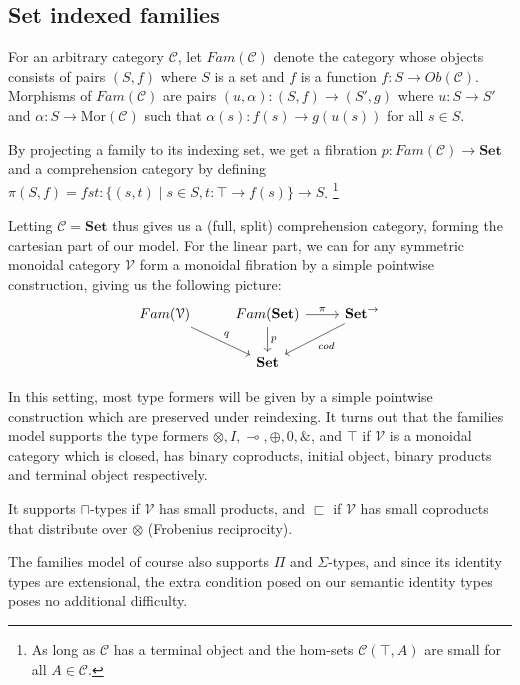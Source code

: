 \documentclass[a4paper,english]{lipics-v2018}
\begin{document}
\subsection{Set indexed families}
\begin{definition}
For an arbitrary category $\mathcal{C}$, let $Fam(\mathcal{C})$ denote the category whose objects consists of pairs $(S, f)$ where $S$ is a set and $f$ is a function $f : S \to Ob(\mathcal{C})$. Morphisms of $Fam(\mathcal{C})$ are pairs $(u, \alpha) : (S, f) \to (S', g)$ where $u : S \to S'$ and $\alpha : S \to \text{Mor}(\mathcal{C})$ such that $\alpha(s) : f(s) \to g(u(s))$ for all $s \in S$.
\end{definition}
By projecting a family to its indexing set, we get a fibration $p : Fam(\mathcal{C}) \to \mathbf{Set}$ and a comprehension category by defining $\pi(S, f) = fst: \{(s, t) \; | \; s \in S, t : \top \to f(s)\} \to S$. \footnote{As long as $\mathcal{C}$ has a terminal object and the hom-sets $\mathcal{C}(\top,A)$ are small for all $A \in \mathcal{C}$.}

Letting $\mathcal{C} = \mathbf{Set}$ thus gives us a (full, split) comprehension category, forming the cartesian part of our model. For the linear part, we can for any symmetric monoidal category $\mathcal{V}$ form a monoidal fibration by a simple pointwise construction, giving us the following picture:
\[
\begin{tikzcd}
Fam(\mathcal{V}) \ar[rd, "q"]  & Fam(\mathbf{Set}) \ar[d, "p"] \ar[r, "\pi"] & \mathbf{Set}^\to \ar[ld, "cod"] \\
& \mathbf{Set}
\end{tikzcd}
\]

In this setting, most type formers will be given by a simple pointwise construction which are preserved under reindexing. It turns out that the families model supports the type formers $\otimes, I, \multimap, \oplus, 0, \&$, and $\top$ if $\mathcal{V}$ is a monoidal category which is closed, has binary coproducts, initial object, binary products and terminal object respectively.

It supports $\sqcap$-types if $\mathcal{V}$ has small products, and $\sqsubset$ if $\mathcal{V}$ has small coproducts that distribute over $\otimes$ (Frobenius reciprocity).

The families model of course also supports $\Pi$ and $\Sigma$-types, and since its identity types are extensional, the extra condition posed on our semantic identity types poses no additional difficulty.
\end{document}
